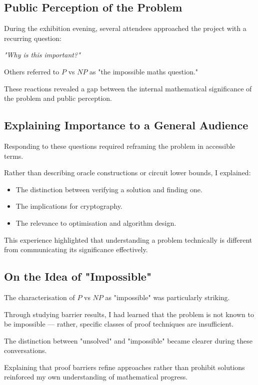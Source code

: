 \documentclass[12pt]{article}
\begin{document}
\subsection*{Public Perception of the Problem}

During the exhibition evening, several attendees approached the project with a recurring question:

\textit{"Why is this important?"}

Others referred to $P$ vs $NP$ as "the impossible maths question."

These reactions revealed a gap between the internal mathematical significance of the problem and public perception.

\subsection*{Explaining Importance to a General Audience}

Responding to these questions required reframing the problem in accessible terms.

Rather than describing oracle constructions or circuit lower bounds, I explained:

\begin{itemize}
\item The distinction between verifying a solution and finding one.
\item The implications for cryptography.
\item The relevance to optimisation and algorithm design.
\end{itemize}

This experience highlighted that understanding a problem technically is different from communicating its significance effectively.

\subsection*{On the Idea of "Impossible"}

The characterisation of $P$ vs $NP$ as "impossible" was particularly striking.

Through studying barrier results, I had learned that the problem is not known to be impossible --- rather, specific classes of proof techniques are insufficient.

The distinction between "unsolved" and "impossible" became clearer during these conversations.

Explaining that proof barriers refine approaches rather than prohibit solutions reinforced my own understanding of mathematical progress.
\end{document}

